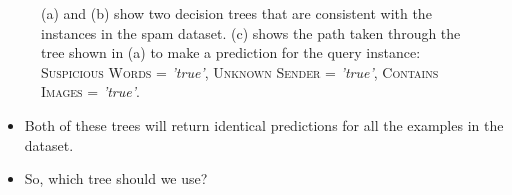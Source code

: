 \documentclass[xcolor={table}]{beamer}
\newcommand{\featN}[1]{\textsc{#1}}
\newcommand{\featL}[1]{\textit{'#1'}}
\begin{document}
 \begin{frame} 
\begin{figure}[htb]
	\centering
	\caption{(a) and (b) show two decision trees that are consistent with the instances in the spam dataset. (c) shows the path taken through the tree shown in (a) to make a prediction for the query instance: \featN{Suspicious Words} = \featL{true}, \featN{Unknown Sender} = \featL{true}, \featN{Contains Images} = \featL{true}.}
	\label{fig:dectrees}
\end{figure}
\end{frame} 

\begin{frame}
	\begin{itemize}
		\item Both of these trees will return identical predictions for all the examples in the dataset.
		\item So, which tree should we use?
	\end{itemize}
\end{frame}
\end{document}
